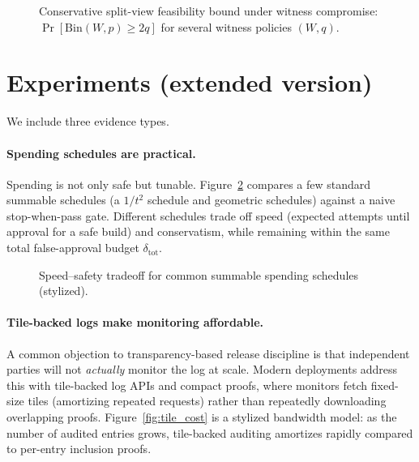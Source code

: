 \documentclass[11pt]{article}
\begin{document}
\begin{figure}[t]
\centering
{}
\caption{Conservative split-view feasibility bound under witness compromise: $\Pr[\mathrm{Bin}(W,p)\ge 2q]$ for several witness policies $(W,q)$.}
\label{fig:witness_quorum}
\end{figure}

\section{Experiments (extended version)}
We include three evidence types.

\paragraph{Spending schedules are practical.}
Spending is not only safe but tunable. Figure~\ref{fig:tradeoff} compares a few standard summable schedules
(a $1/t^2$ schedule and geometric schedules) against a naive stop-when-pass gate.
Different schedules trade off speed (expected attempts until approval for a safe build) and conservatism,
while remaining within the same total false-approval budget $\delta_{\mathrm{tot}}$.

\begin{figure}[t]
\centering
{}
\caption{Speed--safety tradeoff for common summable spending schedules (stylized).}
\label{fig:tradeoff}
\end{figure}

\paragraph{Tile-backed logs make monitoring affordable.}
A common objection to transparency-based release discipline is that independent parties will not \emph{actually} monitor the log at scale.
Modern deployments address this with tile-backed log APIs and compact proofs, where monitors fetch fixed-size tiles (amortizing repeated requests) rather than repeatedly downloading overlapping proofs. \cite{c2sp_tlog_tiles,static_ct_api_spec,tesseract_blog_2025,cloudflare_azul_ct_2025}
Figure~\ref{fig:tile_cost} is a stylized bandwidth model: as the number of audited entries grows, tile-backed auditing amortizes rapidly compared to per-entry inclusion proofs.
\end{document}
